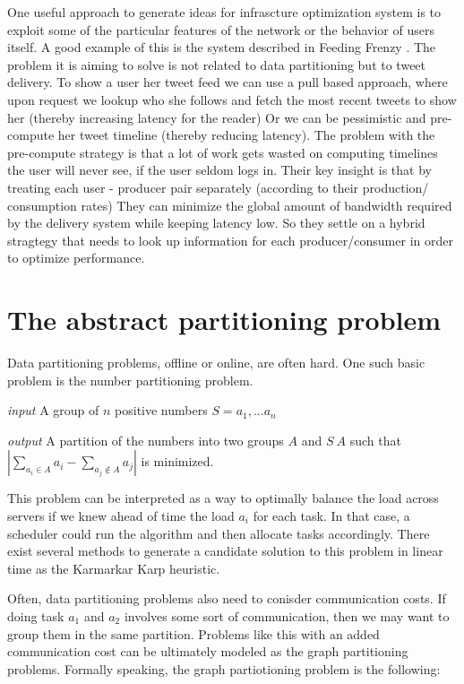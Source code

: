 One useful approach to generate ideas for infrascture optimization system is to exploit some of the particular features of the network or the behavior of users itself. A good example of this is the system described in Feeding Frenzy \cite{frenzy}. The problem it is aiming to solve is not related to data partitioning  but to tweet delivery. To show a user her tweet feed we can use a pull based approach, where upon request we lookup who she follows and fetch the most recent tweets to show her (thereby increasing latency for the reader) Or we can be pessimistic and pre-compute her tweet timeline (thereby reducing latency). The problem with the pre-compute strategy is that a lot of work gets wasted on computing timelines the user will never see, if the user seldom logs in. Their key insight is that by treating each user - producer pair separately (according to their production/ consumption rates) They can minimize the global amount of bandwidth required by the delivery system while keeping latency low. So they settle on a hybrid stragtegy that needs to look up information for each producer/consumer in order to optimize performance. 

\section{The abstract partitioning problem}

Data partitioning problems, offline or online, are often hard. One such basic problem is the number partitioning problem. 

\emph{input} A group of $n$  positive numbers $S = {a_1, ... a_n}$

\emph{output} A partition of the numbers into two groups $A$ and $S \ A$  such that $|\sum_{a_i \in A} a_i - \sum_{a_j \not \in A} a_j|$ is minimized.

This problem can be interpreted as a way to optimally balance the load across servers if we knew ahead of time the load $a_i$ for each task.   In that case, a scheduler could run the algorithm and then allocate tasks accordingly.   There exist several methods to generate a candidate solution to this problem in linear time as the Karmarkar Karp heuristic. 

Often, data partitioning problems also need to conisder communication costs. If doing task $a_1$  and $a_2$ involves some sort of communication, then we may want to group them in the same partition. Problems like this with an added communication cost can be ultimately modeled as the graph partitioning problems. Formally speaking, the graph partiotioning problem is the following:

